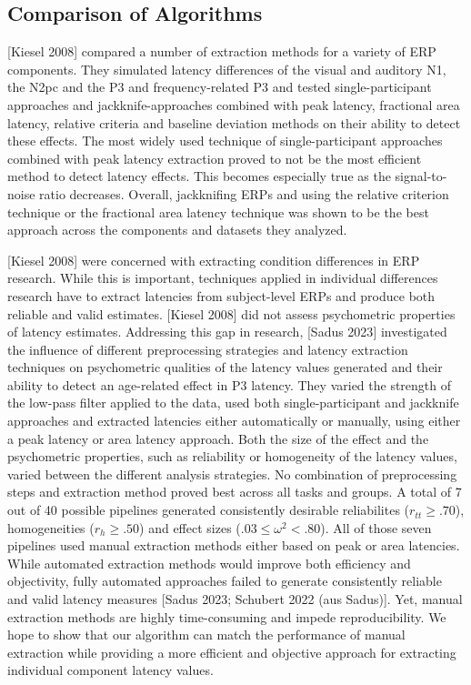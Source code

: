 \documentclass[
  man,floatsintext]{apa7}
\begin{document}
\hypertarget{comparison-of-algorithms}{%
\subsection{Comparison of Algorithms}\label{comparison-of-algorithms}}

{[}Kiesel 2008{]} compared a number of extraction methods for a variety of ERP components. They simulated latency differences of the visual and auditory N1, the N2pc and the P3 and frequency-related P3 and tested single-participant approaches and jackknife-approaches combined with peak latency, fractional area latency, relative criteria and baseline deviation methods on their ability to detect these effects. The most widely used technique of single-participant approaches combined with peak latency extraction proved to not be the most efficient method to detect latency effects. This becomes especially true as the signal-to-noise ratio decreases. Overall, jackknifing ERPs and using the relative criterion technique or the fractional area latency technique was shown to be the best approach across the components and datasets they analyzed.

{[}Kiesel 2008{]} were concerned with extracting condition differences in ERP research. While this is important, techniques applied in individual differences research have to extract latencies from subject-level ERPs and produce both reliable and valid estimates. {[}Kiesel 2008{]} did not assess psychometric properties of latency estimates. Addressing this gap in research, {[}Sadus 2023{]} investigated the influence of different preprocessing strategies and latency extraction techniques on psychometric qualities of the latency values generated and their ability to detect an age-related effect in P3 latency. They varied the strength of the low-pass filter applied to the data, used both single-participant and jackknife approaches and extracted latencies either automatically or manually, using either a peak latency or area latency approach. Both the size of the effect and the psychometric properties, such as reliability or homogeneity of the latency values, varied between the different analysis strategies. No combination of preprocessing steps and extraction method proved best across all tasks and groups. A total of 7 out of 40 possible pipelines generated consistently desirable reliabilites (\(r_{tt} \ge .70\)), homogeneities (\(r_{h} \ge .50\)) and effect sizes (\(.03 \le \omega^2 <.80\)). All of those seven pipelines used manual extraction methods either based on peak or area latencies. While automated extraction methods would improve both efficiency and objectivity, fully automated approaches failed to generate consistently reliable and valid latency measures {[}Sadus 2023; Schubert 2022 (aus Sadus){]}. Yet, manual extraction methods are highly time-consuming and impede reproducibility. We hope to show that our algorithm can match the performance of manual extraction while providing a more efficient and objective approach for extracting individual component latency values.
\end{document}

